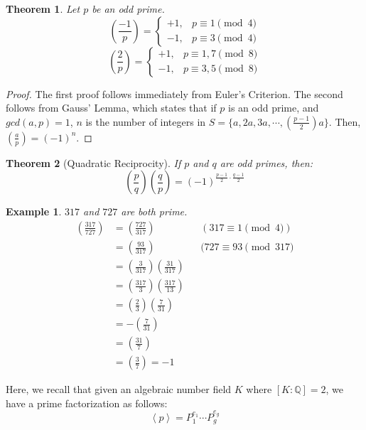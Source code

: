 \documentclass{article}
\newcommand{\la}{\left\langle}
\newcommand{\ra}{\right\rangle}
\newcommand{\Q}{\mathbb{Q}}
\newtheorem{theorem}{Theorem}[subsection]
\newtheorem{example}{Example}[subsection]
\begin{document}
\begin{theorem}
Let $p$ be an odd prime. 
\begin{equation*}
    \left(\frac{-1}{p}\right)=
    \begin{cases}
    +1, &p\equiv 1\pmod{4}\\
    -1, &p\equiv 3\pmod{4}
    \end{cases}
\end{equation*}
\begin{equation*}
    \left(\frac{2}{p}\right)=
    \begin{cases}
    +1, &p\equiv 1,7\pmod{8}\\
    -1, &p\equiv 3,5\pmod{8}
    \end{cases}
\end{equation*}
\end{theorem}
\begin{proof}
The first proof follows immediately from Euler's Criterion. The second follows from Gauss' Lemma, which states that if $p$ is an odd prime, and $gcd(a,p)=1$, $n$ is the number of integers in $S=\{a,2a,3a,\cdots, \left(\frac{p-1}{2}\right)a\}$. Then, $\left(\frac{a}{p}\right)=(-1)^n$.
\end{proof}
\begin{theorem}[Quadratic Reciprocity]
If $p$ and $q$ are odd primes, then:
$$\left(\frac{p}{q}\right)\left(\frac{q}{p}\right)=(-1)^{\frac{p-1}{2}\cdot\frac{q-1}{2}}$$
\end{theorem}
\begin{example}
$317$ and $727$ are both prime.
\begin{align*}
    \left(\frac{317}{727}\right) &= \left(\frac{727}{317}\right) &&(317\equiv 1\pmod{4})\\
    &=\left(\frac{93}{317}\right) &&(727\equiv 93\pmod{317}\\
    &=\left(\frac{3}{317}\right)\left(\frac{31}{317}\right)\\
    &=\left(\frac{317}{3}\right)\left(\frac{317}{13}\right)\\
    &=\left(\frac{2}{3}\right)\left(\frac{7}{31}\right)\\
    &= -\left(\frac{7}{31}\right)\\
    &=\left(\frac{31}{7}\right)\\
    &=\left(\frac{3}{7}\right)= -1
\end{align*}
\end{example}
Here, we recall that given an algebraic number field $K$ where $[K:\Q]=2$, we have a prime factorization as follows:
$$\la p\ra = P_1^{e_1}\cdots P_g^{e_g}$$
\end{document}
